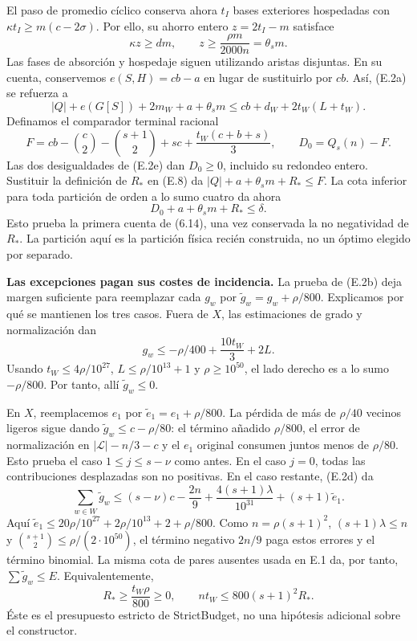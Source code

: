 \documentclass[spanish,11pt,a4paper]{article}
\begin{document}
El paso de promedio cíclico conserva ahora \(t_I\) bases exteriores hospedadas con \(\kappa t_I\ge m(c-2\sigma)\). Por ello, su ahorro entero \(z=2t_I-m\) satisface \[
\kappa z\ge dm,\qquad
z\ge\frac{\rho m}{2000n}=\theta_s m.
\tag{E.7}
\] Las fases de absorción y hospedaje siguen utilizando aristas disjuntas. En su cuenta, conservemos \(e(S,H)=cb-a\) en lugar de sustituirlo por \(cb\). Así, (E.2a) se refuerza a \[
|Q|+e(G[S])+2m_W+a+\theta_s m
\le cb+d_W+2t_W(L+t_W).
\tag{E.8}
\] Definamos el comparador terminal racional \[
F=cb-\binom c2-\binom{s+1}2+sc+
       \frac{t_W(c+b+s)}3,\qquad
D_0=Q_s(n)-F.
\] Las dos desigualdades de (E.2e) dan \(D_0\ge0\), incluido su redondeo entero. Sustituir la definición de \(R_*\) en (E.8) da \(|Q|+a+\theta_s m+R_*\le F\). La cota inferior para toda partición de orden a lo sumo cuatro da ahora \[
D_0+a+\theta_s m+R_*\le\delta.
\tag{E.9}
\] Esto prueba la primera cuenta de (6.14), una vez conservada la no negatividad de \(R_*\). La partición aquí es la partición física recién construida, no un óptimo elegido por separado.

\textbf{Las excepciones pagan sus costes de incidencia.} La prueba de (E.2b) deja margen suficiente para reemplazar cada \(g_w\) por \(\widetilde g_w=g_w+\rho/800\). Explicamos por qué se mantienen los tres casos. Fuera de \(X\), las estimaciones de grado y normalización dan \[
g_w\le-\rho/400+\frac{10t_W}{3}+2L.
\] Usando \(t_W\le4\rho/10^{27}\), \(L\le\rho/10^{13}+1\) y \(\rho\ge10^{50}\), el lado derecho es a lo sumo \(-\rho/800\). Por tanto, allí \(\widetilde g_w\le0\).

En \(X\), reemplacemos \(e_1\) por \(\widetilde e_1=e_1+\rho/800\). La pérdida de más de \(\rho/40\) vecinos ligeros sigue dando \(\widetilde g_w\le c-\rho/80\): el término añadido \(\rho/800\), el error de normalización en \(|\mathcal L|-n/3-c\) y el \(e_1\) original consumen juntos menos de \(\rho/80\). Esto prueba el caso \(1\le j\le s-\nu\) como antes. En el caso \(j=0\), todas las contribuciones desplazadas son no positivas. En el caso restante, (E.2d) da \[
\sum_{w\in W}\widetilde g_w
\le(s-\nu)c-\frac{2n}{9}+
  \frac{4(s+1)\lambda}{10^{31}}+(s+1)\widetilde e_1.
\] Aquí \(\widetilde e_1\le20\rho/10^{27}+2\rho/10^{13}+2+\rho/800\). Como \(n=\rho(s+1)^2\), \((s+1)\lambda\le n\) y \(\binom{s+1}{2}\le\rho/(2\cdot10^{50})\), el término negativo \(2n/9\) paga estos errores y el término binomial. La misma cota de pares ausentes usada en E.1 da, por tanto, \(\sum\widetilde g_w\le E\). Equivalentemente, \[
R_*\ge\frac{t_W\rho}{800}\ge0,\qquad
nt_W\le800(s+1)^2R_*.
\tag{E.10}
\] Éste es el presupuesto estricto de {\ttfamily\small StrictBudget}, no una hipótesis adicional sobre el constructor.
\end{document}
